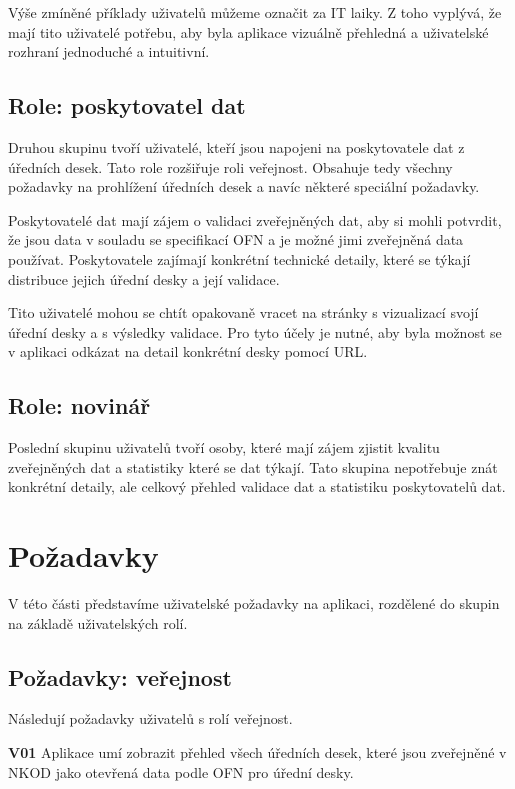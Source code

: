 Výše zmíněné příklady uživatelů můžeme označit za IT laiky. Z toho vyplývá, že mají tito uživatelé potřebu, aby byla aplikace vizuálně přehledná a uživatelské rozhraní jednoduché a intuitivní.

\subsection{Role: poskytovatel dat}

Druhou skupinu tvoří uživatelé, kteří jsou napojeni na poskytovatele dat z úředních desek. Tato role rozšiřuje roli veřejnost. Obsahuje tedy všechny požadavky na prohlížení úředních desek a navíc některé speciální požadavky.

Poskytovatelé dat mají zájem o validaci zveřejněných dat, aby si mohli potvrdit, že jsou data v souladu se specifikací OFN a je možné jimi zveřejněná data používat. Poskytovatele zajímají konkrétní technické detaily, které se týkají distribuce jejich úřední desky a její validace.

Tito uživatelé mohou se chtít opakovaně vracet na stránky s vizualizací svojí úřední desky a s výsledky validace. Pro tyto účely je nutné, aby byla možnost se v aplikaci odkázat na detail konkrétní desky pomocí URL.

\subsection{Role: novinář}

Poslední skupinu uživatelů tvoří osoby, které mají zájem zjistit kvalitu zveřejněných dat a statistiky které se dat týkají. Tato skupina nepotřebuje znát konkrétní detaily, ale celkový přehled validace dat a statistiku poskytovatelů dat.

\section{Požadavky}

V této části představíme uživatelské požadavky na aplikaci, rozdělené do skupin na základě uživatelských rolí.

\subsection{Požadavky: veřejnost}

Následují požadavky uživatelů s rolí veřejnost.

   \textbf{V01} Aplikace umí zobrazit přehled všech úředních desek, které jsou zveřejněné v NKOD jako otevřená data podle OFN pro úřední desky.
   

